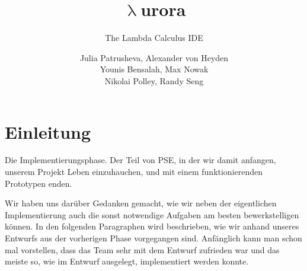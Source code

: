 \documentclass[parskip=full,11pt,twoside]{scrartcl}
\title{\textbf{$\uplambda$}urora}
\subtitle{The Lambda Calculus IDE}
\author{Julia Patrusheva, Alexander von Heyden\\
Younis Bensalah, Max Nowak\\
Nikolai Polley, Randy Seng}
\begin{document}
\maketitle
\tableofcontents
\newpage
\section{Einleitung}
Die Implementierungsphase.
Der Teil von PSE, in der wir damit anfangen, unserem Projekt Leben einzuhauchen, und mit einem funktionierenden Prototypen enden.
\newline

Wir haben uns darüber Gedanken gemacht, wie wir neben der eigentlichen Implementierung auch die sonst notwendige Aufgaben am besten bewerkstelligen können.
In den folgenden Paragraphen wird beschrieben, wie wir anhand unseres Entwurfs aus der vorherigen Phase vorgegangen sind.
Anfänglich kann man schon mal vorstellen, dass das Team sehr mit dem Entwurf zufrieden war und das meiste so, wie im Entwurf ausgelegt, implementiert werden konnte.
\newline
\newpage

\end{document}
